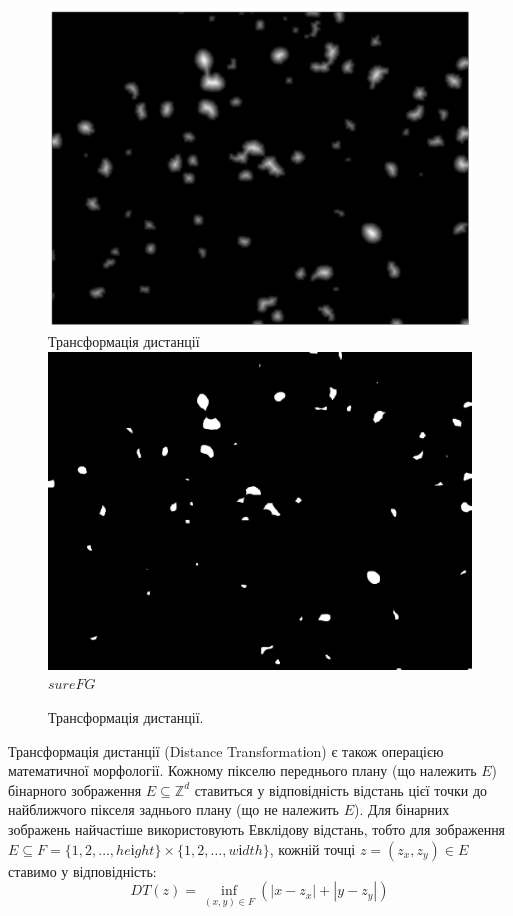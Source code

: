 \begin{figure}[t!]
	\centering	
	\includegraphics[width=0.95\linewidth]{Figures/Chapter2/4a.png}
	Трансформація дистанції
	\endminipage\hfill
	\centering	
	\includegraphics[width=0.95\linewidth]{Figures/Chapter2/4b.png}
	\(sureFG\)
	\endminipage\hfill
	
	\caption{Трансформація дистанції.}
	\label{fig:dist_transform}
\end{figure}

Трансформація дистанції (Dіstance Transformatіon) є також операцією математичної морфології. Кожному пікселю переднього плану (що належить \(E\)) бінарного зображення \(E \subseteq \mathbb{Z}^d\) ставиться у відповідність відстань цієї точки до найближчого пікселя заднього плану (що не належить \(E\)). Для бінарних зображень найчастіше використовують Евклідову відстань, тобто для зображення \(E \subseteq F = \{1, 2, \dots, heіght\} \times \{1, 2, \dots, wіdth\}\), кожній точці \(z = (z_x, z_y) \in E\) ставимо у відповідність:
\begin{equation*}
DT(z) = \inf_{(x, y) \in F}{(|x - z_x| + |y - z_y|)}
\end{equation*}

